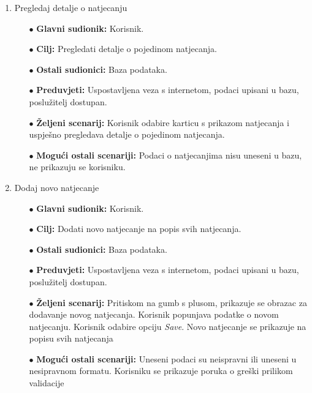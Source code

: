\documentclass[times, utf8, zavrsni]{fer}
\begin{document}
\begin{enumerate}
    \item Pregledaj detalje o natjecanju
    \begin{itemize}
        \item[$\bullet$] \textbf{Glavni sudionik:} Korisnik.
        \item[$\bullet$] \textbf{Cilj:} Pregledati detalje o pojedinom natjecanja.
        \item[$\bullet$] \textbf{Ostali sudionici:} Baza podataka.
        \item[$\bullet$] \textbf{Preduvjeti:} Uspostavljena veza s internetom, podaci upisani u bazu, poslužitelj dostupan.
        \item[$\bullet$] \textbf{Željeni scenarij:} Korisnik odabire karticu s prikazom natjecanja i uspješno pregledava detalje o pojedinom natjecanja.
        \item[$\bullet$] \textbf{Mogući ostali scenariji:} Podaci o natjecanjima nisu uneseni u bazu, ne prikazuju se korisniku.
    \end{itemize}



    \item Dodaj novo natjecanje
    \begin{itemize}
        \item[$\bullet$] \textbf{Glavni sudionik:} Korisnik.
        \item[$\bullet$] \textbf{Cilj:} Dodati novo natjecanje na popis svih natjecanja.
        \item[$\bullet$] \textbf{Ostali sudionici:} Baza podataka.
        \item[$\bullet$] \textbf{Preduvjeti:} Uspostavljena veza s internetom, podaci upisani u bazu, poslužitelj dostupan.
        \item[$\bullet$] \textbf{Željeni scenarij:} Pritiskom na gumb s plusom, prikazuje se obrazac za dodavanje novog natjecanja. Korisnik popunjava podatke
        o novom natjecanju. Korisnik odabire opciju \textit{Save}. Novo natjecanje se prikazuje na popisu svih natjecanja
        \item[$\bullet$] \textbf{Mogući ostali scenariji:} Uneseni podaci su neispravni ili uneseni u nesipravnom formatu. 
        Korisniku se prikazuje poruka o greški prilikom validacije
    \end{itemize}



\end{enumerate}
\end{document}

